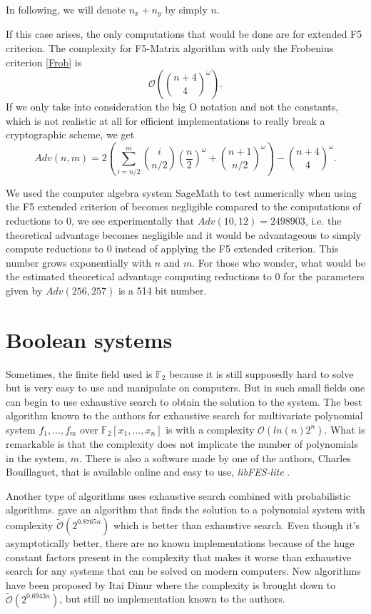 \documentclass[english]{article}
\begin{document}
		 In following, we will denote $n_x + n_y$ by simply $n$.
		 
		 If this case arises, the only computations that would be done are for extended F5 criterion. The complexity for F5-Matrix algorithm with only the Frobenius criterion \ref{Frob} is 
		 $$
		 \mathcal{O}\left(\binom{n + 4}{4}^\omega\right).
		 $$
		 If we only take into consideration the big O notation and not the constants, which is not realistic at all for efficient implementations to really break a cryptographic scheme, we get
		 \begin{equation}
		 Adv(n, m) = 2\left(\sum_{i = n/2}^{m}\binom{i}{n/2}\left(\frac{n}{2}\right)^\omega + \binom{n + 1}{n/2}^\omega\right) - \binom{n + 4}{4}^\omega.
		 \label{equation_complex}
		 \end{equation}
		 
		 We used the computer algebra system SageMath \cite{sagemath} to test numerically when using the F5 extended criterion of \cite{FSS11} becomes negligible compared to the computations of reductions to 0, we see experimentally that $Adv(10, 12) = 2498903$, i.e. the theoretical advantage becomes negligible and it would be advantageous to simply compute reductions to 0 instead of applying the F5 extended criterion. This number grows exponentially with $n$ and $m$. For those who wonder, what would be the estimated theoretical advantage computing reductions to 0 for the parameters given by \cite{HJ23} $Adv(256, 257)$ is a 514 bit number.
		 
	\section{Boolean systems}
		Sometimes, the finite field used is $\mathbb{F}_2$ because it is still supposedly hard to solve but is very easy to use and manipulate on computers. But in such small fields one can begin to use exhaustive search to obtain the solution to the system. The best algorithm known to the authors for exhaustive search for multivariate polynomial system $f_1,\dots,f_m$ over $\mathbb{F}_2[x_1,\dots,x_n]$ is \cite{BCC+10} with a complexity $\mathcal{O}(ln(n)2^n)$. What is remarkable is that the complexity does not implicate the number of polynomials in the system, $m$. There is also a software made by one of the authors, Charles Bouillaguet, that is available online and easy to use, \textit{libFES-lite} \cite{Bouilla22}.
		
		Another type of algorithms uses exhaustive search combined with probabilistic algorithms. \cite{LPT+17} gave an algorithm that finds the solution to a polynomial system with complexity $\tilde{\mathcal{O}}(2^{0.8765n})$ which is better than exhaustive search. Even though it's asymptotically better, there are no known implementations because of the huge constant factors present in the complexity that makes it worse than exhaustive search for any systems that can be solved on modern computers. New algorithms have been proposed by Itai Dinur \cite{Itai21A, Itai21B} where the complexity is brought down to $\tilde{\mathcal{O}}(2^{0.6943n})$, but still no implementation known to the authors.
		
\end{document}
